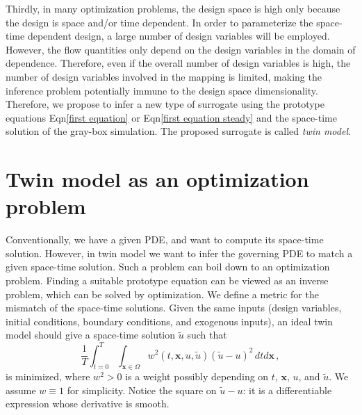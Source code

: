 \documentclass[a4paper,onecolumn]{article}
\theoremstyle{remark}
\begin{document}
\noindent Thirdly, in many optimization problems, the design space is high only because
the design is space and/or time dependent. In order to parameterize the space-time dependent
design, a large number of design variables will be employed. However, 
the flow quantities only depend on the design variables in the domain of dependence.
Therefore, even if the overall number of design variables is high, the number of design variables
involved in the mapping is limited, making the inference problem potentially
immune to the design space dimensionality.\\

\noindent Therefore, we propose to infer a new type of surrogate using 
the prototype equations Eqn\eqref{first equation} or
Eqn\eqref{first equation steady} and the space-time solution of the gray-box simulation.
The proposed surrogate is called \emph{twin model}.



\section{Twin model as an optimization problem}
\label{inverse}
\noindent 
Conventionally, we have a given PDE, and want to compute
its space-time solution. However, in twin model we want to infer the governing PDE
to match a given space-time solution.
Such a problem can boil down to an optimization problem.
Finding a suitable prototype equation can be viewed
as an inverse problem, which can be solved by optimization.
We define a metric for the mismatch of the space-time solutions.
Given the same inputs (design variables, initial conditions, boundary conditions, and exogenous 
inputs), an ideal twin model should give a space-time solution $\tilde{u}$ such that
\begin{equation}
    \frac{1}{T}
    \int_{t=0}^T\int_{\mathbf{x}\in\Omega} w^2(t,\mathbf{x}, u,\tilde{u}) (\tilde{u} - 
    u)^2 \, dtd\mathbf{x}\,,
    \label{minimizer twin model}
\end{equation}
is minimized,
where $w^2>0$ is a weight possibly depending on $t$, $\mathbf{x}$, $u$, and $\tilde{u}$.
We assume $w\equiv 1$ for simplicity.
Notice the square on $\tilde{u}-u$: it is a differentiable expression
whose derivative is smooth.\\
\end{document}
